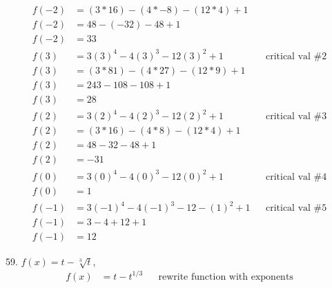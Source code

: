 \documentclass{article}
\begin{document}
\begin{description}
\begin{description}
\begin{align*}
                        f(-2) & = (3*16) - (4*-8) - (12*4) + 1                                  \\
                        f(-2) & = 48 - (-32) - 48 + 1                                           \\
                        f(-2) & = 33                                                            \\[2em]
                        f(3)  & = 3(3)^4 - 4(3)^3 - 12(3)^2 + 1    &  & \text{critical val \#2} \\
                        f(3)  & = (3*81) - (4*27) - (12*9) + 1                                  \\
                        f(3)  & = 243 - 108 - 108 + 1                                           \\
                        f(3)  & = 28                                                            \\[2em]
                        f(2)  & = 3(2)^4 - 4(2)^3 - 12(2)^2 + 1    &  & \text{critical val \#3} \\
                        f(2)  & = (3*16) - (4*8) - (12*4) + 1                                   \\
                        f(2)  & = 48 - 32 - 48 + 1                                              \\
                        f(2)  & = -31                                                           \\[2em]
                        f(0)  & = 3(0)^4 - 4(0)^3 - 12(0)^2 + 1    &  & \text{critical val \#4} \\
                        f(0)  & = 1                                                             \\[2em]
                        f(-1) & = 3(-1)^4 - 4(-1)^3 - 12-(1)^2 + 1 &  & \text{critical val \#5} \\
                        f(-1) & = 3 - 4 + 12 + 1                                                \\
                        f(-1) & = 12
                    \end{align*}
              \item 59. $f(x) = t - \sqrt[3]{t}$, \space [-1, 4]
                    \begin{align*}
                        f(x)  & = t - t^{1/3}             &  & \text{rewrite function with exponents} \\[1em]

\end{align*}
\end{description}
\end{description}
\end{document}
